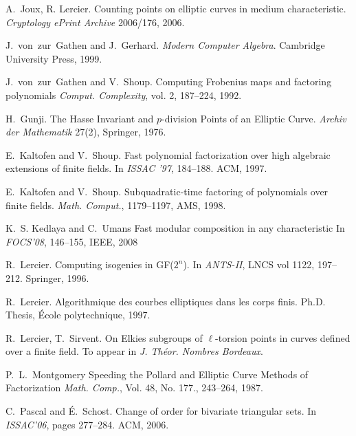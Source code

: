 \begin{thebibliography}{AAAA00}
A.~Joux, R. Lercier.
  \newblock Counting points on elliptic curves in medium characteristic.
  \newblock \emph{Cryptology ePrint Archive} 2006/176, 2006.

  J.~von~zur~Gathen and J.~Gerhard. 
  \newblock \emph{Modern Computer Algebra}. 
  \newblock Cambridge University Press, 1999.

  J.~von~zur~Gathen and V.~Shoup. 
  \newblock Computing Frobenius maps and factoring polynomials
  \newblock \emph{Comput. Complexity}, vol. 2, 187--224, 1992.
  
H.~Gunji.
    \newblock The Hasse Invariant and $p$-division Points of an Elliptic Curve.
  \newblock \emph{Archiv der Mathematik} 27(2), Springer, 1976.

  E.~Kaltofen and V.~Shoup.
  \newblock Fast polynomial factorization over high algebraic extensions
  of finite fields.
  \newblock In \emph{ISSAC '97}, 184--188. ACM, 1997.

  E.~Kaltofen and V.~Shoup.
  \newblock Subquadratic-time factoring of polynomials over finite fields.
  \newblock \emph{Math. Comput.}, 1179--1197, AMS, 1998.

  K.~S. Kedlaya and C.~Umans
  \newblock Fast modular composition in any characteristic
  \newblock In {\em FOCS'08}, 146--155, IEEE, 2008
  
  R.~Lercier.
  \newblock Computing isogenies in GF($2^n$).
  \newblock In {\em ANTS-II}, LNCS vol 1122, 197--212. Springer, 1996.

  R.~Lercier.
  \newblock Algorithmique des courbes elliptiques dans les corps finis. 
  \newblock Ph.D. Thesis, {\'E}cole polytechnique, 1997.

  R.~Lercier, T.~Sirvent.
  \newblock On Elkies subgroups of $\ell$-torsion points in curves defined over
  a finite field.
  \newblock To appear in {\em J. Th\'eor. Nombres Bordeaux}.

  P.~L.~Montgomery
  \newblock Speeding the Pollard and Elliptic Curve Methods of Factorization
  \newblock \emph{Math. Comp.}, Vol. 48, No. 177., 243--264, 1987.

  C.~Pascal and \'E.~Schost.
  \newblock Change of order for bivariate triangular sets.
  \newblock In \emph{ISSAC'06}, pages 277--284. ACM, 2006.


\end{thebibliography}
